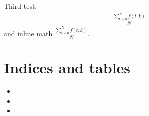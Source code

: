 \documentclass[letterpaper,10pt,english]{sphinxmanual}
\begin{document}
Third test.
\begin{equation*}
\begin{split}\frac{ \sum_{t=0}^{N}f(t,k) }{N}\end{split}
\end{equation*}
and inline math \(\frac{ \sum_{t=0}^{N}f(t,k) }{N}\).


\chapter{Indices and tables}
\label{\detokenize{index:indices-and-tables}}\begin{itemize}
\item {} 

\item {} 

\item {} 

\end{itemize}



\renewcommand{\indexname}{Index}
\printindex
\end{document}
